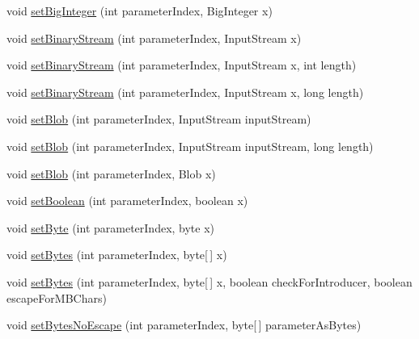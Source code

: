 \begin{DoxyCompactItemize}
\item 
void \mbox{\hyperlink{classcom_1_1mysql_1_1cj_1_1_server_prepared_query_bindings_ab81e179cfe11eae84351444568fbee4d}{set\+Big\+Integer}} (int parameter\+Index, Big\+Integer x)
\item 
void \mbox{\hyperlink{classcom_1_1mysql_1_1cj_1_1_server_prepared_query_bindings_a7b8bb84e6cb781aab13abb84d2a3276c}{set\+Binary\+Stream}} (int parameter\+Index, Input\+Stream x)
\item 
void \mbox{\hyperlink{classcom_1_1mysql_1_1cj_1_1_server_prepared_query_bindings_a2c8a07aee8516156266725bc69297b86}{set\+Binary\+Stream}} (int parameter\+Index, Input\+Stream x, int length)
\item 
void \mbox{\hyperlink{classcom_1_1mysql_1_1cj_1_1_server_prepared_query_bindings_aa81aca5e6bb04f6c6cfc24d4f2d26379}{set\+Binary\+Stream}} (int parameter\+Index, Input\+Stream x, long length)
\item 
void \mbox{\hyperlink{classcom_1_1mysql_1_1cj_1_1_server_prepared_query_bindings_acf46739f3b451c6cc8c43db12b7d9224}{set\+Blob}} (int parameter\+Index, Input\+Stream input\+Stream)
\item 
void \mbox{\hyperlink{classcom_1_1mysql_1_1cj_1_1_server_prepared_query_bindings_a24fc6f66b7713d7e0b97be6d5ea7df53}{set\+Blob}} (int parameter\+Index, Input\+Stream input\+Stream, long length)
\item 
void \mbox{\hyperlink{classcom_1_1mysql_1_1cj_1_1_server_prepared_query_bindings_af6a3ba466e49614d3fc89f149064c8a8}{set\+Blob}} (int parameter\+Index, Blob x)
\item 
void \mbox{\hyperlink{classcom_1_1mysql_1_1cj_1_1_server_prepared_query_bindings_a7650f0c71b10f4031e0618c67caa49c4}{set\+Boolean}} (int parameter\+Index, boolean x)
\item 
void \mbox{\hyperlink{classcom_1_1mysql_1_1cj_1_1_server_prepared_query_bindings_aa5eb382beb3a3f46e3b10c241d0e08b9}{set\+Byte}} (int parameter\+Index, byte x)
\item 
void \mbox{\hyperlink{classcom_1_1mysql_1_1cj_1_1_server_prepared_query_bindings_a2a41a80f8d33e94789246c672600b59b}{set\+Bytes}} (int parameter\+Index, byte\mbox{[}$\,$\mbox{]} x)
\item 
void \mbox{\hyperlink{classcom_1_1mysql_1_1cj_1_1_server_prepared_query_bindings_a437398de7d3ea2b63585fd8f70757977}{set\+Bytes}} (int parameter\+Index, byte\mbox{[}$\,$\mbox{]} x, boolean check\+For\+Introducer, boolean escape\+For\+M\+B\+Chars)
\item 
void \mbox{\hyperlink{classcom_1_1mysql_1_1cj_1_1_server_prepared_query_bindings_ae5db575417b547ac58cf4576fc48d547}{set\+Bytes\+No\+Escape}} (int parameter\+Index, byte\mbox{[}$\,$\mbox{]} parameter\+As\+Bytes)

\end{DoxyCompactItemize}
